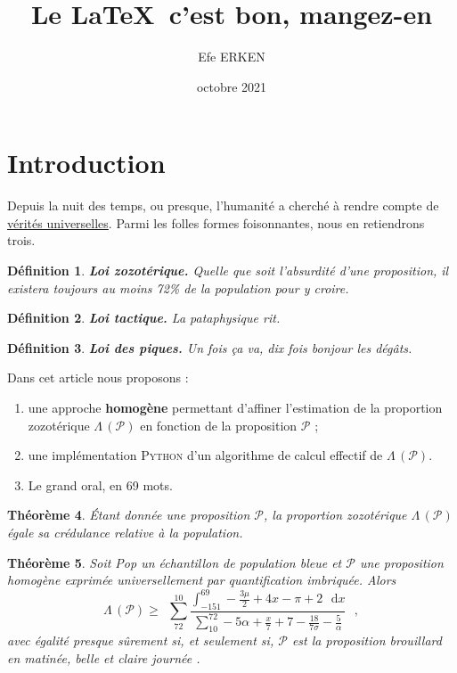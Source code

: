\documentclass{article}
\newtheorem{definition}{Définition}
\newtheorem{theorem}[definition]{Théorème}
\begin{document}
	\author{Efe ERKEN}
	\date{octobre 2021}
	\title{Le \LaTeX\ c'est bon, mangez-en}
	\maketitle
	
	\section{Introduction}
	Depuis la nuit des temps, ou presque, l’humanité a cherché à rendre compte de \underline{vérités universelles}. Parmi les folles formes foisonnantes, nous en retiendrons trois.
	\label{sec:label1}
	
	\begin{definition}
	\textbf{Loi zozotérique.} Quelle que soit l’absurdité d’une proposition, il existera toujours au moins 72\% de la population pour y croire.
	\label{def:label1}
	\end{definition}

	\begin{definition}
	\textbf{Loi tactique.} La pataphysique rit.
	\label{def:label2}
	\end{definition}

	\begin{definition}
	\textbf{Loi des piques.} Un fois ça va, dix fois bonjour les dégâts.
	\label{def:label3}
	\end{definition}	

	\noindent Dans cet article nous proposons :
	\begin{enumerate}
		\item une approche \textbf{homogène} permettant d’affiner l’estimation de la proportion zozotérique $\Lambda\,(\mathcal{P})$ en fonction de la proposition $\mathcal{P}$ ;
		\item une implémentation \textsc{Python} d’un algorithme de calcul effectif de $\Lambda\,(\mathcal{P})$.
		\item Le grand oral, en 69 mots.
	\end{enumerate}
	
	\begin{theorem}
		Étant donnée une proposition $\mathcal{P}$, la proportion zozotérique $\Lambda\,(\mathcal{P})$ égale sa crédulance relative à la population.
		\label{theo:label1}
	\end{theorem}
	
	\begin{theorem}
		Soit Pop un échantillon de population bleue et $\mathcal{P}$ une proposition homogène exprimée universellement par quantification imbriquée. Alors
		\[
		\Lambda\,(\mathcal{P}) \geqslant \, \; \sum_{72}^{10} \frac{\int_{-151}^{69} - \frac{3\mu}{2} + 4x - \pi + 2 \, \: \; \mathrm{d}x}{\sum_{10}^{72} - 5\alpha + \frac{x}{7} + 7 - \frac{18}{7\sigma} - \frac{5}{\alpha}} \, \: \;  \mathrm{,}
		\]
		avec égalité presque sûrement si, et seulement si, $\mathcal{P}$ est la proposition \og brouillard en matinée, belle et claire journée \fg.
		\label{theo:label2}
	\end{theorem}
	
\end{document}
